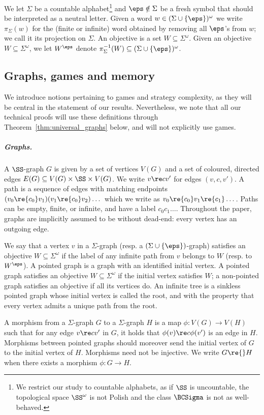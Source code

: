 We let $\Sigma$ be a countable alphabet\footnote{We restrict our study to countable alphabets, as if $\SS$ is uncountable, the topological space $\SS^\omega$ is not Polish and the class $\BCSigma$ is not as well-behaved.} and $\eps\notin \Sigma$ be a fresh symbol that should be interpreted as a neutral letter.
Given a word $w \in (\Sigma \cup \{\eps\})^\omega$ we write $\pi_\Sigma(w)$ for the (finite or infinite) word obtained by removing all $\eps$'s from $w$; we call it its projection on $\Sigma$.
An objective is a set $W \subseteq \Sigma^\omega$.
Given an objective $W \subseteq \Sigma^\omega$, we let $W^\eps$ denote $\pi_\Sigma^{-1}(W) \subseteq (\Sigma \cup \{\eps\})^\omega$.

\subsection{Graphs, games and memory}

We introduce notions pertaining to games and strategy complexity, as they will be central in the statement of our results.
Nevertheless, we note that all our technical proofs will use these definitions through Theorem~\ref{thm:universal_graphs} below, and will not explicitly use games.

\subparagraph*{Graphs.}
A $\SS$-graph $G$ is given by a set of vertices $V(G)$ and a set of coloured, directed edges $E(G) \subseteq V(G) \times \SS \times V(G)$.
We write $v \re c v'$ for edges $(v,c,v')$.
A path is a sequence of edges with matching endpoints $(v_0 \re {c_0} v_1)(v_1 \re{c_0} v_2) \dots$ which we write as $v_0 \re {c_0} v_1 \re{c_1} \dots$.
Paths can be empty, finite, or infinite, and have a label $c_0c_1\dots$.
Throughout the paper, graphs are implicitly assumed to be without dead-end: every vertex has an outgoing edge.

We say that a vertex $v$ in a $\Sigma$-graph (resp. a $(\Sigma \cup \{\eps\})$-graph) satisfies an objective $W \subseteq \Sigma^\omega$ if the label of any infinite path from $v$ belongs to $W$ (resp. to $W^\eps$).
A pointed graph is a graph with an identified initial vertex.
A pointed graph satisfies an objective $W \subseteq \Sigma^\omega$ if the initial vertex satisfies $W$; a non-pointed graph satisfies an objective if all its vertices do.
An infinite tree is a sinkless pointed graph whose initial vertex is called the root, and with the property that every vertex admits a unique path from the root.

A morphism from a $\Sigma$-graph $G$ to a $\Sigma$-graph $H$ is a map $\phi: V(G) \to V(H)$ such that for any edge $v \re c v'$ in $G$, it holds that $\phi(v) \re c \phi(v')$ is an edge in $H$.
Morphisms between pointed graphs should moreover send the initial vertex of $G$ to the initial vertex of $H$.
Morphisms need not be injective.
We write %
$G \re{} H$ when there exists a morphism $\phi \colon G \to H$.

